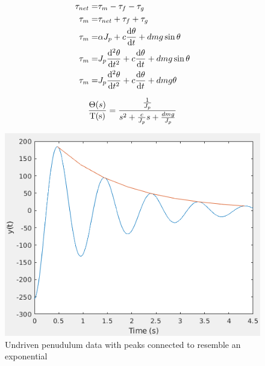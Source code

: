 \documentclass[a4paper, 11pt, compsoc]{IEEEtran}
\begin{document}
        \begin{equation}\label{eq:secondOrderDE}
            \begin{split}    
                \tau_{net} = & \tau_m - \tau_f - \tau_g \\
                \tau_m = & \tau_{net} + \tau_f + \tau_g \\ 
                \tau_m = & \alpha J_p + c\dv{\theta}{t} + dmg\sin{\theta} \\ 
                \tau_m =  & J_p \dv[2]{\theta}{t} + c\dv{\theta}{t} + dmg\sin{\theta} \\
                \tau_m =  & J_p \dv[2]{\theta}{t} + c\dv{\theta}{t} + dmg\theta
            \end{split}
        \end{equation}

        \begin{equation}\label{eq:pendulumTF}
            \frac{\Theta(s)}{\rm T(s)} = \frac{\frac{1}{J_p}}{s^2 + \frac{c}{J_p}s + \frac{dmg}{J_p}}
        \end{equation}

        \begin{figure}
            \centering
            \includegraphics[width=\columnwidth]{plottedPendulumData.png}
            \caption{Undriven penudulum data with peaks connected to resemble an exponential}
            \label{fig:pendulumData}
        \end{figure}
\end{document}
